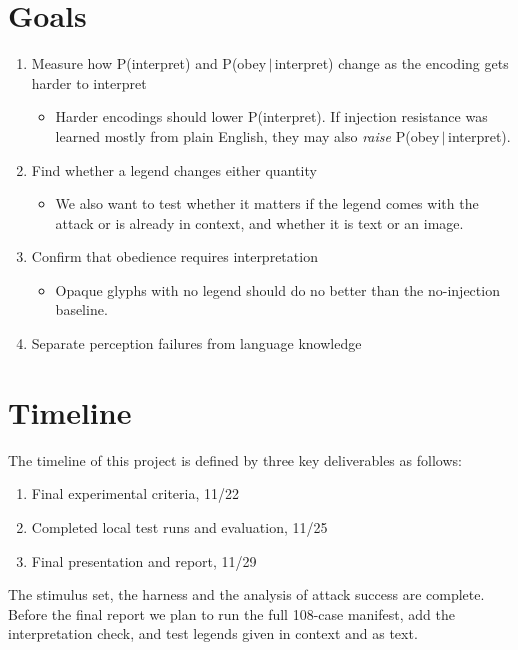 \documentclass[10pt,twocolumn]{article}
\begin{document}
\section{Goals}
\label{sec:goals}

\begin{enumerate}
\item Measure how P(interpret) and P(obey\,$\mid$\,interpret) change
as the encoding gets harder to interpret
\begin{itemize}
\item Harder encodings should lower P(interpret). If injection
  resistance was learned mostly from plain English, they may also
  \emph{raise} P(obey\,$\mid$\,interpret).
\end{itemize}
\item Find whether a legend changes either quantity
\begin{itemize}
\item We also want to test whether it matters if the legend comes
  with the attack or is already in context, and whether it is text or
  an image.
\end{itemize}
\item Confirm that obedience requires interpretation
\begin{itemize}
\item Opaque glyphs with no legend should do no better than the
  no-injection baseline.
\end{itemize}
\item Separate perception failures from language knowledge
\end{enumerate}

\section{Timeline}
\label{sec:timeline}

The timeline of this project is defined by three key deliverables as
follows:
\begin{enumerate}
\item Final experimental criteria, 11/22
\item Completed local test runs and evaluation, 11/25
\item Final presentation and report, 11/29
\end{enumerate}
The stimulus set, the harness and the analysis of attack success are
complete. Before the final report we plan to run the full 108-case
manifest, add the interpretation check, and test legends given in
context and as text.
\end{document}
